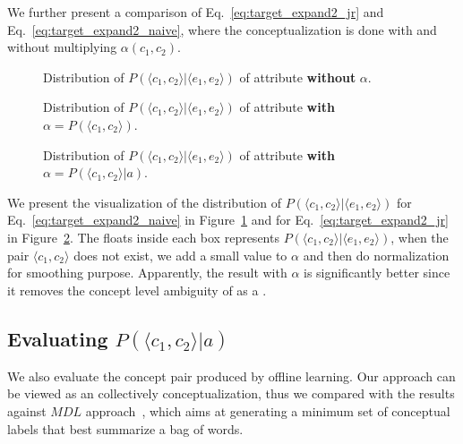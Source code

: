 We further present a comparison of Eq.~\ref{eq:target_expand2_jr} and Eq.~\ref{eq:target_expand2_naive}, where the conceptualization is done with and without multiplying $\alpha(c_1,c_2)$.

\begin{figure}[!htb]
\centering
{}
\caption{Distribution of $P(\langle c_1,c_2 \rangle|\langle e_1,e_2 \rangle )$ of attribute  \textbf{without} $\alpha$. }
\label{fig:c1c2}
\end{figure}

\begin{figure}[!htb]
\centering
{}
\caption{Distribution of $P(\langle c_1,c_2 \rangle|\langle e_1,e_2 \rangle )$ of attribute  \textbf{with} $\alpha=P(\langle c_1,c_2 \rangle)$. }
\label{fig:c1c2_alpha}
\end{figure}

\begin{figure}[!htb]
\centering
{}
\caption{Distribution of $P(\langle c_1,c_2 \rangle|\langle e_1,e_2 \rangle )$ of attribute  \textbf{with} $\alpha=P(\langle c_1,c_2 \rangle|a)$. }
\label{fig:c1c2_alpha_given_a}
\end{figure}


We present the visualization of the distribution of $P(\langle c_1,c_2 \rangle|\langle e_1,e_2 \rangle )$ for Eq.~\ref{eq:target_expand2_naive} in Figure~\ref{fig:c1c2} and for Eq.~\ref{eq:target_expand2_jr} in Figure~\ref{fig:c1c2_alpha}.
The floats inside each box represents $P(\langle c_1,c_2 \rangle|\langle e_1,e_2 \rangle )$, when the pair $\langle c_1,c_2 \rangle$ does not exist, we add a small value to $\alpha$ and then do normalization for smoothing purpose.
Apparently, the result with $\alpha$ is significantly better since it removes the concept level ambiguity of  as a .

\subsection{Evaluating $P(\langle c_1,c_2 \rangle |a )$}

We also evaluate the concept pair produced by offline learning.
Our approach can be viewed as an collectively conceptualization, thus we compared with the results against $MDL$ approach~\cite{sunconceptual}, which aims at generating a minimum set of conceptual labels that best summarize a bag of words.

